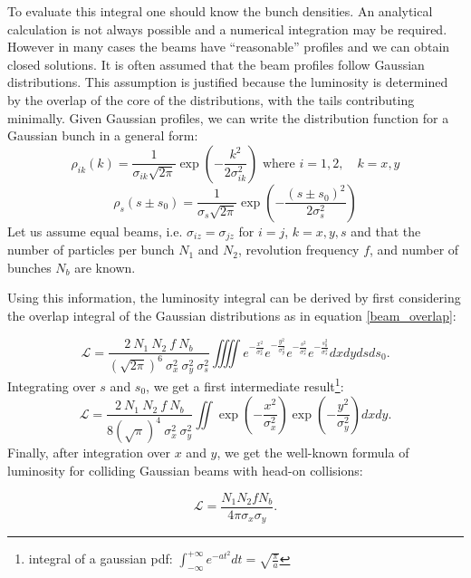 To evaluate this integral one should know the bunch densities. An analytical calculation is not always possible and a numerical integration may be required. However in many cases the beams have ``reasonable” profiles and we can obtain closed solutions. It is often assumed that the beam profiles follow Gaussian distributions. This assumption is justified because the luminosity is determined by the overlap of the core of the distributions, with the tails contributing minimally.
Given Gaussian profiles, we can write the distribution function for a Gaussian bunch in a general form:
\begin{equation}
\rho_{ik}(k) =\frac{1}{\sigma_{ik}\sqrt{2\pi}} \exp\left( -\frac{k^2}{2 \sigma_{ik}^2} \right) \text{ where } i=1,2, \quad k=x,y
\end{equation}
\begin{equation}
\rho_{s}(s\pm s_0) =\frac{1}{\sigma_s\sqrt{2\pi}} \exp\left( -\frac{(s\pm s_0)^2}{2 \sigma_s^2} \right)
\end{equation}
Let us assume equal beams, i.e.  $\sigma_{iz} = \sigma_{jz}$ for $i=j$, $k=x,y,s$ and that the number of particles per bunch $N_1$ and $N_2$, revolution frequency $f$, and number of bunches $N_b$ are known. 

Using this information, the luminosity integral can be derived by first considering the overlap integral of the Gaussian distributions as in equation \eqref{beam_overlap}:

\begin{equation}
\mathcal{L} = \frac{2\  N_1\ N_2\ f\ N_b}{(\sqrt{2\pi})^6\ \sigma_x^2\ \sigma_y^2\ \sigma_s^2}\iiiint e^{-\frac{x^2}{ \sigma_x^2}} e^{-\frac{y^2}{\sigma_y^2}} e^{-\frac{s^2}{\sigma_s^2}}e^{-\frac{s_0^2}{\sigma_s^2}}dxdydsds_0.
\end{equation}
Integrating over $s$ and $s_0$, we get a first intermediate result\footnote{integral of a gaussian pdf: $\int_{-\infty}^{+\infty}e^{-at^2}dt = \sqrt{\tfrac{\pi}{a}}$}:
\begin{equation}
    \mathcal{L} = \frac{2\  N_1\ N_2\ f\ N_b}{8(\sqrt{\pi})^4\ \sigma_x^2\ \sigma_y^2}\iint \exp\left(-\frac{x^2}{\sigma_x^2}\right) \exp\left(-\frac{y^2}{\sigma_y^2}\right) dxdy .\label{spec_lumi_gaus}
\end{equation}
Finally, after integration over $x$ and $y$, we get the well-known formula of luminosity for colliding Gaussian beams with head-on collisions:

\begin{equation}
\mathcal{L} = \frac{N_1  N_2  f N_b}{4 \pi  \sigma_x \sigma_y}.
\end{equation}

